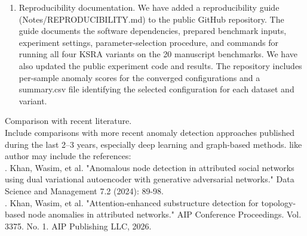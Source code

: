 \documentclass{ar2rc}
\begin{document}
{\begin{enumerate}
    \item Reproducibility documentation. We have added a reproducibility guide (Notes/REPRODUCIBILITY.md) to the public GitHub repository. The guide documents the software dependencies, prepared benchmark inputs, experiment settings, parameter-selection procedure, and commands for running all four KSRA variants on the 20 manuscript benchmarks. We have also updated the public experiment code and results. The repository includes per-sample anomaly scores for the converged configurations and a summary.csv file identifying the selected configuration for each dataset and variant.
\end{enumerate}
}

\begin{tcolorbox}[title = {The Reviewer \#1's Comment 5}]
Comparison with recent literature. \\
Include comparisons with more recent anomaly detection approaches published during the last 2–3 years, especially deep learning and graph-based methods. like author may include the references: \\
. Khan, Wasim, et al. "Anomalous node detection in attributed social networks using dual variational autoencoder with generative adversarial networks." Data Science and Management 7.2 (2024): 89-98. \\
. Khan, Wasim, et al. "Attention-enhanced substructure detection for topology-based node anomalies in attributed networks." AIP Conference Proceedings. Vol. 3375. No. 1. AIP Publishing LLC, 2026.
\end{tcolorbox}
\end{document}
